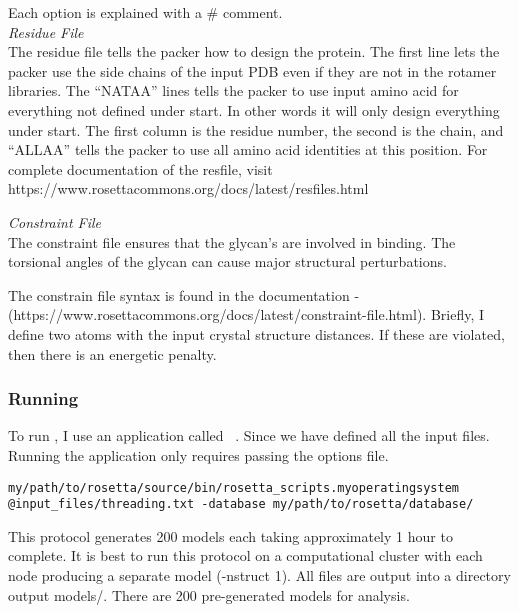 
Each option is explained with a \# comment.\\

\textit{Residue File}\\
The residue file tells the packer how to design the protein. The first line lets the packer use the side chains of the input PDB even if they are not in the rotamer libraries. The ``NATAA'' lines tells the packer to use input amino acid for everything not defined under start. In other words it will only design everything under start. The first column is the residue number, the second is the chain, and ``ALLAA'' tells the packer to use all amino acid identities at this position. For complete documentation of the resfile, visit https://www.rosettacommons.org/docs/latest/resfiles.html



\textit{Constraint File} \\
The constraint file ensures that the glycan's are involved in binding. The torsional angles of the glycan can cause major structural perturbations.


The constrain file syntax is found in the documentation - \\(https://www.rosettacommons.org/docs/latest/constraint-file.html). Briefly, I define two atoms with the input crystal structure distances. If these are violated, then there is an energetic penalty. \\

\subsubsection{Running \rosetta}
To run \rosetta, I use an application called \scripts~\citep{Fleishman:2011ji}. Since we have defined all the input files. Running the application only requires passing the options file.

\begin{lstlisting}[breaklines=true]
my/path/to/rosetta/source/bin/rosetta_scripts.myoperatingsystem @input_files/threading.txt -database my/path/to/rosetta/database/
\end{lstlisting}

This protocol generates 200 models each taking approximately 1 hour to complete. It is best to run this protocol on a computational cluster with each node producing a separate model (-nstruct 1). All files are output into a directory output models/. There are 200 pre-generated models for analysis. \\

